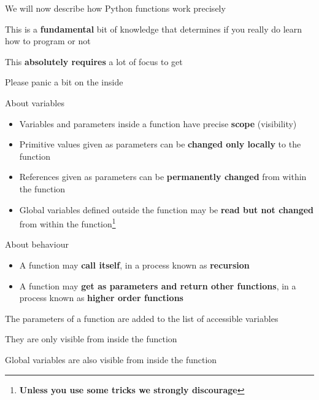 \documentclass{beamer}
\begin{document}
\begin{slide}{
\item We will now describe how Python functions work precisely
\item This is a \textbf{fundamental} bit of knowledge that determines if you really do learn how to program or not
\item This \textbf{absolutely requires} a lot of focus to get
\item Please panic a bit on the inside
}\end{slide}

\begin{slide}{
\item About variables
\begin{itemize}
\item Variables and parameters inside a function have precise \textbf{scope} (visibility)
\item Primitive values given as parameters can be \textbf{changed only locally} to the function
\item References given as parameters can be \textbf{permanently changed} from within the function
\item Global variables defined outside the function may be \textbf{read but not changed} from within the function\footnote{\textbf{Unless you use some tricks we strongly discourage}}
\end{itemize}
\item About behaviour
\begin{itemize}
\item A function may \textbf{call itself}, in a process known as \textbf{recursion}
\item A function may \textbf{get as parameters and return other functions}, in a process known as \textbf{higher order functions}
\end{itemize}
}\end{slide}

\begin{slide}{
\item The parameters of a function are added to the list of accessible variables
\item They are only visible from inside the function
\item Global variables are also visible from inside the function
}\end{slide}
\end{document}
